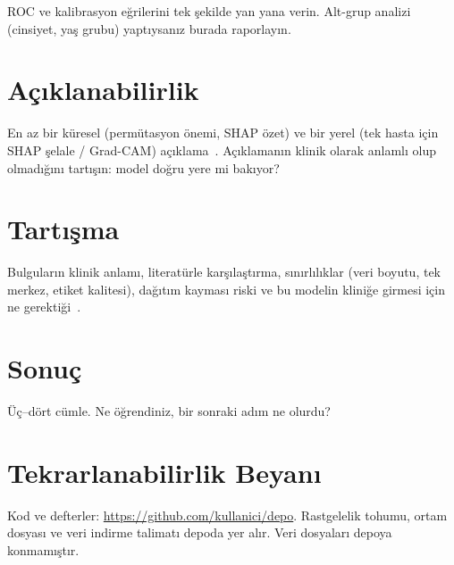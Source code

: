 \documentclass[11pt,a4paper]{article}
\newcommand{\depo}{https://github.com/kullanici/depo}
\begin{document}
ROC ve kalibrasyon eğrilerini tek şekilde yan yana verin. Alt-grup analizi (cinsiyet, yaş grubu) yaptıysanız burada raporlayın.

\section{Açıklanabilirlik}
En az bir küresel (permütasyon önemi, SHAP özet) ve bir yerel (tek hasta için SHAP şelale / Grad-CAM) açıklama~\cite{lundberg2017shap}. Açıklamanın klinik olarak anlamlı olup olmadığını tartışın: model doğru yere mi bakıyor?

\section{Tartışma}
Bulguların klinik anlamı, literatürle karşılaştırma, sınırlılıklar (veri boyutu, tek merkez, etiket kalitesi), dağıtım kayması riski ve bu modelin kliniğe girmesi için ne gerektiği~\cite{collins2024tripod}.

\section{Sonuç}
Üç–dört cümle. Ne öğrendiniz, bir sonraki adım ne olurdu?

\section*{Tekrarlanabilirlik Beyanı}
Kod ve defterler: \url{\depo}. Rastgelelik tohumu, ortam dosyası ve veri indirme talimatı depoda yer alır. Veri dosyaları depoya konmamıştır.



\end{document}
